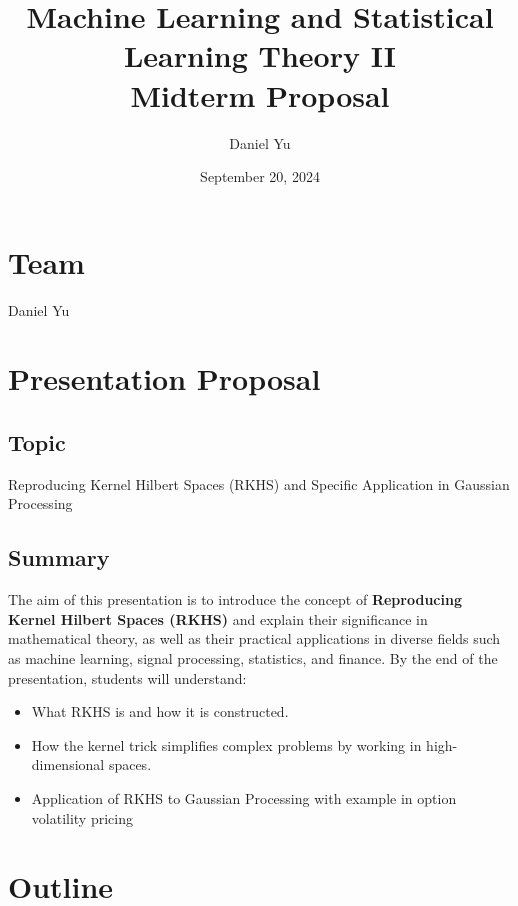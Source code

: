 \documentclass[a4paper]{article}
\title{\Huge{Machine Learning and Statistical Learning Theory II}\\ Midterm Proposal}
\author{\huge{Daniel Yu}}
\date{September 20, 2024}
\begin{document}
\maketitle
\newpage%
\section{Team}
Daniel Yu
\section{Presentation Proposal}
\subsection{Topic}
Reproducing Kernel Hilbert Spaces (RKHS) and Specific Application in Gaussian Processing
\subsection{Summary}
The aim of this presentation is to introduce the concept of \textbf{Reproducing Kernel Hilbert Spaces (RKHS)} and explain their significance in mathematical theory, as well as their practical applications in diverse fields such as machine learning, signal processing, statistics, and finance. By the end of the presentation, students will understand:
\begin{itemize}
    \item What RKHS is and how it is constructed.
    \item How the kernel trick simplifies complex problems by working in high-dimensional spaces.
    \item Application of RKHS to Gaussian Processing with example in option volatility pricing
\end{itemize}

\section{Outline}
\end{document}
